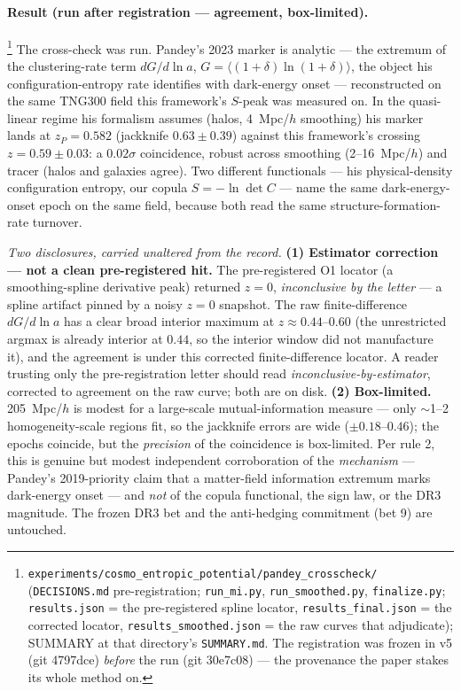 \documentclass[11pt,a4paper]{article}
\begin{document}
\paragraph{Result (run after registration --- agreement, box-limited).}\footnote{\texttt{experiments/cosmo\_entropic\_potential/pandey\_crosscheck/} (\texttt{DECISIONS.md} pre-registration; \texttt{run\_mi.py}, \texttt{run\_smoothed.py}, \texttt{finalize.py}; \texttt{results.json} = the pre-registered spline locator, \texttt{results\_final.json} = the corrected locator, \texttt{results\_smoothed.json} = the raw curves that adjudicate); SUMMARY at that directory's \texttt{SUMMARY.md}. The registration was frozen in v5 (git 4797dce) \emph{before} the run (git 30e7c08) --- the provenance the paper stakes its whole method on.} The cross-check was run. Pandey's 2023 marker is analytic --- the extremum of the clustering-rate term $dG/d\ln a$, $G = \langle(1+\delta)\ln(1+\delta)\rangle$, the object his configuration-entropy rate identifies with dark-energy onset --- reconstructed on the same TNG300 field this framework's $S$-peak was measured on. In the quasi-linear regime his formalism assumes (halos, 4~Mpc/$h$ smoothing) his marker lands at $z_P = 0.582$ (jackknife $0.63 \pm 0.39$) against this framework's crossing $z = 0.59 \pm 0.03$: a $0.02\sigma$ coincidence, robust across smoothing (2--16~Mpc/$h$) and tracer (halos and galaxies agree). Two different functionals --- his physical-density configuration entropy, our copula $S = -\ln\det C$ --- name the same dark-energy-onset epoch on the same field, because both read the same structure-formation-rate turnover.

\emph{Two disclosures, carried unaltered from the record.} \textbf{(1) Estimator correction --- not a clean pre-registered hit.} The pre-registered O1 locator (a smoothing-spline derivative peak) returned $z = 0$, \emph{inconclusive by the letter} --- a spline artifact pinned by a noisy $z = 0$ snapshot. The raw finite-difference $dG/d\ln a$ has a clear broad interior maximum at $z \approx 0.44$--$0.60$ (the unrestricted argmax is already interior at $0.44$, so the interior window did not manufacture it), and the agreement is under this corrected finite-difference locator. A reader trusting only the pre-registration letter should read \emph{inconclusive-by-estimator}, corrected to agreement on the raw curve; both are on disk. \textbf{(2) Box-limited.} 205~Mpc/$h$ is modest for a large-scale mutual-information measure --- only $\sim$1--2 homogeneity-scale regions fit, so the jackknife errors are wide ($\pm 0.18$--$0.46$); the epochs coincide, but the \emph{precision} of the coincidence is box-limited. Per rule 2, this is genuine but modest independent corroboration of the \emph{mechanism} --- Pandey's 2019-priority claim that a matter-field information extremum marks dark-energy onset --- and \emph{not} of the copula functional, the sign law, or the DR3 magnitude. The frozen DR3 bet and the anti-hedging commitment (bet 9) are untouched.
\end{document}
